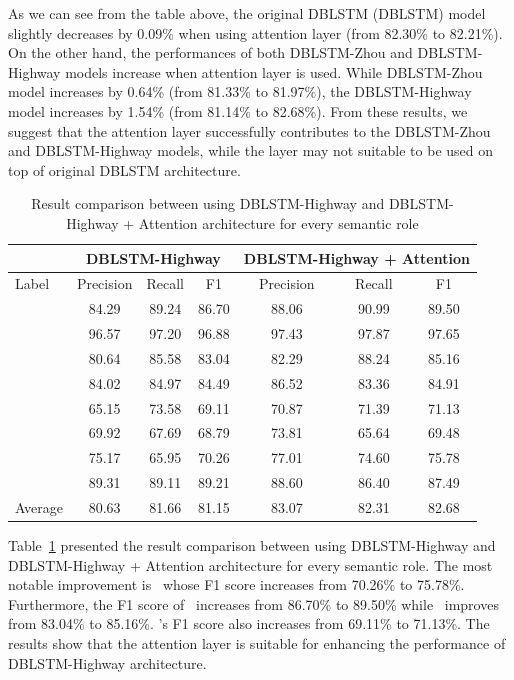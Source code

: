 As we can see from the table above, the original DBLSTM (DBLSTM) model slightly decreases by 0.09\% when using attention layer (from 82.30\% to 82.21\%). On the other hand, the performances of both DBLSTM-Zhou and DBLSTM-Highway models increase when attention layer is used. While DBLSTM-Zhou model increases by 0.64\% (from 81.33\% to 81.97\%), the DBLSTM-Highway model increases by 1.54\% (from 81.14\% to 82.68\%). From these results, we suggest that the attention layer successfully contributes to the DBLSTM-Zhou and DBLSTM-Highway models, while the layer may not suitable to be used on top of original DBLSTM architecture.

\begin{table}
	\centering
	\caption{Result comparison between using DBLSTM-Highway and DBLSTM-Highway + Attention architecture for every semantic role}
	\label{tab:dblstmhighwayattention}
	\begin{tabular}{|l|ccc|ccc|}
		\hline
		& \multicolumn{3}{c}{ DBLSTM-Highway } & \multicolumn{3}{c}{ DBLSTM-Highway + Attention} \\
		\hline
		Label & Precision & Recall & F1 & Precision & Recall & F1 \\
		\hline\hline
		\agent & 84.29 & 89.24 & 86.70 & 88.06 & 90.99 & 89.50\\
		\predicate & 96.57 & 97.20 & 96.88 & 97.43 & 97.87 & 97.65\\
		\patient  & 80.64 & 85.58 & 83.04 & 82.29 & 88.24 & 85.16 \\
		\modal & 84.02 & 84.97 & 84.49 & 86.52 & 83.36 & 84.91\\
		\beneficiary & 65.15 & 73.58 & 69.11 & 70.87 & 71.39 & 71.13\\
		\location & 69.92 & 67.69 & 68.79 & 73.81 & 65.64 & 69.48\\
		\greet  & 75.17 & 65.95 & 70.26 & 77.01 & 74.60 & 75.78\\
		\timesrl & 89.31 & 89.11 & 89.21 & 88.60 & 86.40 & 87.49\\
		\hline
		Average & 80.63 & 81.66 & 81.15 & 83.07& 82.31& 82.68\\
		\hline
	\end{tabular}
	
\end{table}

Table~\ref{tab:dblstmhighwayattention} presented the result comparison between using DBLSTM-Highway and DBLSTM-Highway + Attention architecture for every semantic role. The most notable improvement is \greet~whose F1 score increases from 70.26\% to 75.78\%. Furthermore, the F1 score of \agent~increases from 86.70\% to 89.50\% while \patient~improves from 83.04\% to 85.16\%. \beneficiary's F1 score also increases from 69.11\% to 71.13\%. The results show that the attention layer is suitable for enhancing the performance of DBLSTM-Highway architecture.

